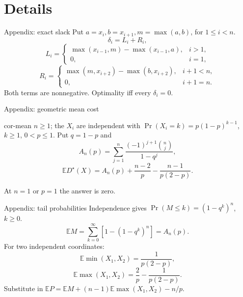 \documentclass{beamer}
\begin{document}
\section{Details}
\begin{frame}{Appendix: exact slack}
Put $a=x_i,b=x_{i+1},m=\max(a,b)$, for $1\leq i<n$.
\[
\delta_i=L_i+R_i,
\]
\[
L_i=\begin{cases}\max(x_{i-1},m)-\max(x_{i-1},a),&i>1,\\0,&i=1,\end{cases}
\]
\[
R_i=\begin{cases}\max(m,x_{i+2})-\max(b,x_{i+2}),&i+1<n,\\0,&i+1=n.\end{cases}
\]
Both terms are nonnegative. Optimality iff every $\delta_i=0$.
\end{frame}
\begin{frame}{Appendix: geometric mean cost}
\begin{bookresult}{cor-mean}
$n\geq1$; the $X_i$ are independent with
$\Pr(X_i=k)=p(1-p)^{k-1}$, $k\geq1$, $0<p\leq1$.
Put $q=1-p$ and
\[
A_n(p)=\sum_{j=1}^{n}\frac{(-1)^{j+1}\binom nj}{1-q^j},
\]
\[
\mathbb E D^{\star}(X)=A_n(p)+\frac{n-2}{p}-\frac{n-1}{p(2-p)}.
\]
\end{bookresult}
At $n=1$ or $p=1$ the answer is zero.
\end{frame}
\begin{frame}{Appendix: tail probabilities}
Independence gives $\Pr(M\leq k)=(1-q^k)^n$, $k\geq0$.
\[
\mathbb E M=\sum_{k=0}^{\infty}[1-(1-q^k)^n]=A_n(p).
\]
For two independent coordinates:
\[
\mathbb E\min(X_1,X_2)=\frac{1}{p(2-p)},
\]
\[
\mathbb E\max(X_1,X_2)=\frac{2}{p}-\frac{1}{p(2-p)}.
\]
Substitute in $\mathbb E P=\mathbb E M+(n-1)\mathbb E\max(X_1,X_2)-n/p$.
\end{frame}
\FormalVerification
\end{document}
